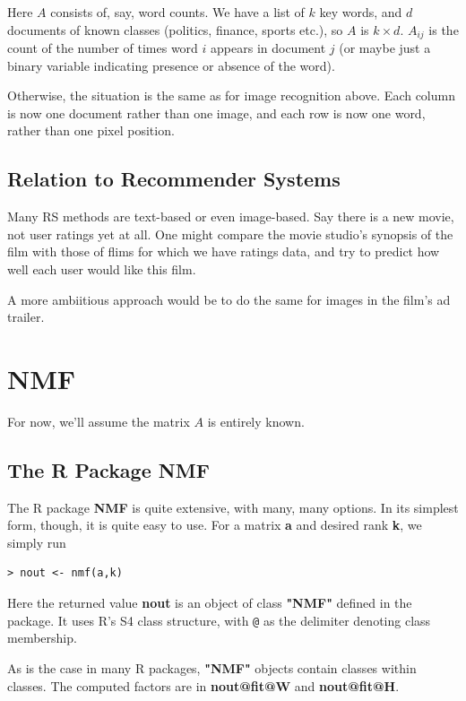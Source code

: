 Here $A$ consists of, say, word counts. We have a list of $k$ key words,
and $d$ documents of known classes (politics, finance, sports etc.), so
$A$ is $k \times d$.  $A_{ij}$ is the count of the number of times word
$i$ appears in document $j$ (or maybe just a binary variable indicating
presence or absence of the word).

Otherwise, the situation is the same as for image recognition above.
Each column is now one document rather than one image, and each row is
now one word, rather than one pixel position.

\subsection{Relation to Recommender Systems}

Many RS methods are text-based or even image-based.  Say there is a new
movie, not user ratings yet at all.  One might compare the movie
studio's synopsis of the film with those of flims for which we have
ratings data, and try to predict how well each user would like this
film.

A more ambiitious approach would be to do the same for images in the film's
ad trailer.

\section{NMF}

For now, we'll assume the matrix $A$ is entirely known.

\subsection{The R Package NMF}

The R package {\bf NMF} is quite extensive, with many, many options.  In
its simplest form, though, it is quite easy to use.  For a matrix {\bf
a} and desired rank {\bf k}, we simply run

\begin{lstlisting}
> nout <- nmf(a,k)
\end{lstlisting}

Here the returned value {\bf nout} is an object of class {\bf "NMF"}
defined in the package.  It uses R's S4 class structure, with
\lstinline{@} as the delimiter denoting class membership.  

As is the case in many R packages, {\bf "NMF"} objects contain classes
within classes.  The computed factors are in {\bf nout@fit@W} and {\bf
nout@fit@H}.

